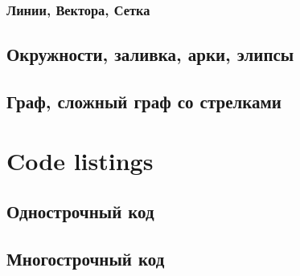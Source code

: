 \documentclass[a4paper,14pt]{book}
\begin{document}
\subsubsection{Линии, Вектора, Сетка}





\subsection{Окружности, заливка, арки, элипсы}



\subsection{Граф, сложный граф со стрелками}




\section{Code listings}

\subsection{Однострочный код}



\subsection{Многострочный код}



\setcounter{tocdepth}{3}

\tableofcontents
\end{document}
